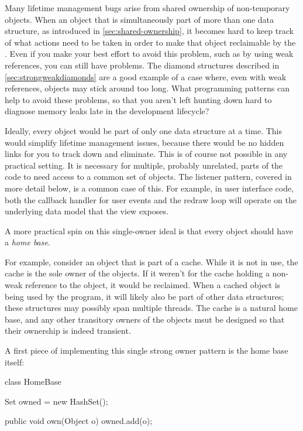 Many lifetime management bugs arise from shared ownership of non-temporary
objects. When an object that is simultaneously part of more than one data
structure, as introduced in \autoref{sec:shared-ownership}, it becomes hard to
keep track of what actions need to be taken in order to make that object
reclaimable by the \jre. Even if you make your best effort to avoid this problem,
such as by using weak references, you can still have problems. The diamond
structures described in \autoref{sec:strongweakdiamonds} are a good example of a
case where, even with weak references, objects may stick around too long. What
programming patterns can help to avoid these problems, so that you aren't left
hunting down hard to diagnose memory leaks late in the development lifecycle?

Ideally, every object would be part of only one data structure at a time. This
would simplify lifetime management issues, because there would be no hidden
links for you to track down and eliminate. This is of course not possible in any
practical setting. It is necessary for multiple, probably unrelated, parts of
the code to need access to a common set of objects. The listener pattern,
covered in more detail below, is a common case of this. For example, in user
interface code, both the callback handler for user events and the redraw loop
will operate on the underlying data model that the view exposes.

A more practical spin on this single-owner ideal is that every object
should have a \emph{home base}.

For example, consider an object that is part of a cache. While it is not in use,
the cache is the sole owner of the objects. If it weren't for the cache holding
a non-weak reference to the object, it would be reclaimed. When a cached object
is being used by the program, it will likely also be part of other data
structures; these structures may possibly span multiple threads. The cache is a
natural home base, and any other transitory owners of the objects msut be
designed so that their ownership is indeed transient.

A first piece of implementing this single strong owner pattern is the home base
itself:
\begin{shortlisting}
class HomeBase {   
   Set owned = new HashSet();
   
   public void own(Object o) {
      owned.add(o);
   }
}
\end{shortlisting}

